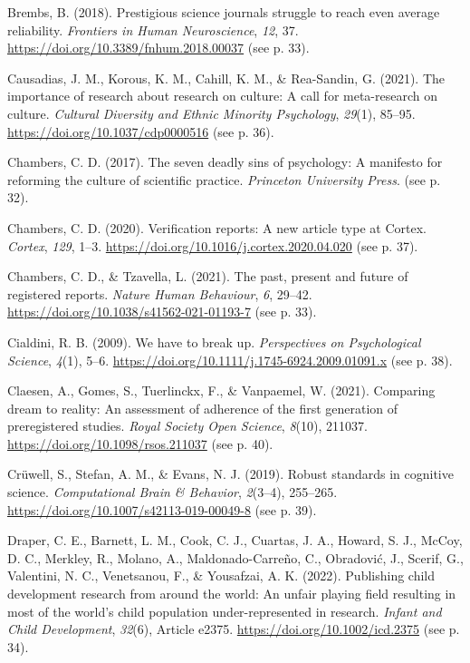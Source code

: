 \documentclass[authordate, empirical,issue]{jote-new-article}
\begin{document}
Brembs, B. (2018). Prestigious science journals struggle to reach even average reliability. \emph{Frontiers in Human Neuroscience}, \emph{12}, 37. \url{https://doi.org/10.3389/fnhum.2018.00037} (see p. 33).

Causadias, J. M., Korous, K. M., Cahill, K. M., \& Rea-Sandin, G. (2021). The importance of research about research on culture: A call for meta-research on culture. \emph{Cultural Diversity and Ethnic Minority Psychology}, \emph{29}(1), 85–95. \url{https://doi.org/10.1037/cdp0000516} (see p. 36).

Chambers, C. D. (2017). The seven deadly sins of psychology: A manifesto for reforming the culture of scientific practice. \emph{Princeton University Press}. (see p. 32).

Chambers, C. D. (2020). Verification reports: A new article type at Cortex. \emph{Cortex}, \emph{129}, 1–3. \url{https://doi.org/10.1016/j.cortex.2020.04.020} (see p. 37).

Chambers, C. D., \& Tzavella, L. (2021). The past, present and future of registered reports. \emph{Nature Human Behaviour}, \emph{6}, 29–42. \url{https://doi.org/10.1038/s41562-021-01193-7} (see p. 33).

Cialdini, R. B. (2009). We have to break up. \emph{Perspectives on Psychological Science}, \emph{4}(1), 5–6. \url{https://doi.org/10.1111/j.1745-6924.2009.01091.x} (see p. 38).

Claesen, A., Gomes, S., Tuerlinckx, F., \& Vanpaemel, W. (2021). Comparing dream to reality: An assessment of adherence of the first generation of preregistered studies. \emph{Royal Society Open Science}, \emph{8}(10), 211037. \url{https://doi.org/10.1098/rsos.211037} (see p. 40).

Crüwell, S., Stefan, A. M., \& Evans, N. J. (2019). Robust standards in cognitive science. \emph{Computational Brain \& Behavior}, \emph{2}(3–4), 255–265. \url{https://doi.org/10.1007/s42113-019-00049-8} (see p. 39).

Draper, C. E., Barnett, L. M., Cook, C. J., Cuartas, J. A., Howard, S. J., McCoy, D. C., Merkley, R., Molano, A., Maldonado-Carreño, C., Obradović, J., Scerif, G., Valentini, N. C., Venetsanou, F., \& Yousafzai, A. K. (2022). Publishing child development research from around the world: An unfair playing field resulting in most of the world’s child population under-represented in research. \emph{Infant and Child Development}, \emph{32}(6), Article e2375. \url{https://doi.org/10.1002/icd.2375} (see p. 34).
\end{document}
